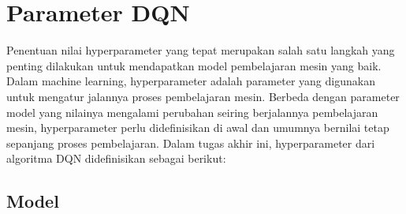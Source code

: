 \section{Parameter DQN}
\label{sec:parameter_dqn}
Penentuan nilai hyperparameter yang tepat merupakan salah satu langkah yang penting dilakukan untuk mendapatkan model pembelajaran mesin yang baik. Dalam machine learning, hyperparameter adalah parameter yang digunakan untuk mengatur jalannya proses pembelajaran mesin. Berbeda dengan parameter model yang nilainya mengalami perubahan seiring berjalannya pembelajaran mesin, hyperparameter perlu didefinisikan di awal dan umumnya bernilai tetap sepanjang proses pembelajaran. Dalam tugas akhir ini, hyperparameter dari algoritma DQN didefinisikan sebagai berikut:

\subsection{Model}
\label{sec:model}
\begin{table}[H]
\caption{Hyperparameter model.}
\label{tb:hyperparameter_model}
\end{table}

